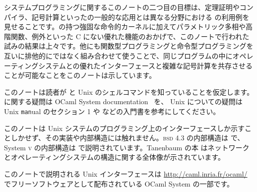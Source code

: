 システムプログラミングに関するこのノートの二つ目の目標は、定理証明やコンパイラ、記号計算といった\ocaml の一般的な応用とは異なる分野における \ocaml の利用例を見せることです。\ocaml の持つ強固な命令的カーネルに加えてパラメトリック多相や高階関数、例外といった C にない優れた機能のおかげで、このノートで行われた試みの結果は上々です。他にも関数型プログラミングと命令型プログラミングを互いに排他的にではなく組み合わせて使うことで、同じプログラムの中にオペレーティングシステムとの優れたインターフェースと複雑な記号計算を共存させることが可能なことをこのノートは示しています。

このノートは読者が \ocaml と Unix のシェルコマンドを知っていることを仮定します。\ocaml に関する疑問は OCaml System documentation~\cite{OCaml} を、 Unix についての疑問は Unix \texttt{man}ual のセクション 1 や \cite{KP,R1} などの入門書を参考にしてください。


このノートは Unix システムのプログラミング上のインターフェースしか示すことしかせず、その実装や内部構造には触れません。\textsc{bsd} 4.3 の内部構造は \cite{BSD} で、 System \textsc{v} の内部構造は \cite{Bach} で説明されています。Tanenbaum の本 \cite{T1, T2} はネットワークとオペレーティングシステムの構造に関する全体像が示されています。

このノートで説明される Unix インターフェースは \url{http://caml.inria.fr/ocaml/} でフリーソフトウェアとして配布されている OCaml System の一部です。
